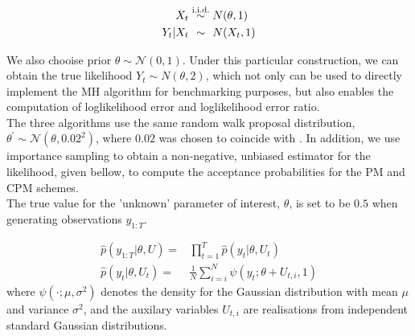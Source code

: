 \documentclass{article}
\begin{document}
  \begin{align*}
  X_t &\overset{\text{i.i.d.}}{\sim} N(\theta, 1) \\
  Y_t | X_t &\overset{\hphantom{\text{i.i.d.}}}{\sim} N(X_t, 1)
  \end{align*}

We also chooise prior $\theta \sim \mathcal{N}(0,1)$. Under this particular construction, we can obtain the true likelihood $Y_t \sim N(\theta, 2)$, which not only can be used to directly implement the MH algorithm for benchmarking purposes, but also enables the computation of loglikelihood error and loglikelihood error ratio.\\


The three algorithms use the same random walk proposal distribution, $ \theta^\prime \sim \mathcal{N}(\theta, 0.02^2)$, where $0.02$ was chosen to coincide with \cite{cpmmDeligiannidis2015}. In addition, we use importance sampling to obtain a non-negative, unbiased estimator for the likelihood, given bellow, to compute the acceptance probabilities for the PM and CPM schemes.\\

The true value for the 'unknown' parameter of interest, $\theta$, is set to be $0.5$ when generating observations $y_{1:T}$.

\begin{align}
\hat{p}(y_{1:T}| \theta, U) =& \prod_{t=1}^{T} \hat{p}(y_t|\theta, U_t) \\
\hat{p}(y_t| \theta, U_t)=& \frac{1}{N} \sum_{i=i}^N \psi (y_t; \theta + U_{t,i}, 1)
\end{align}
where $\psi(\cdot; \mu, \sigma^2)$ denotes the density for the Gaussian distribution with mean $\mu$ and variance $\sigma^2$, and the auxilary variables $U_{t,i}$ are realisations from independent standard Gaussian distributions.
\end{document}
